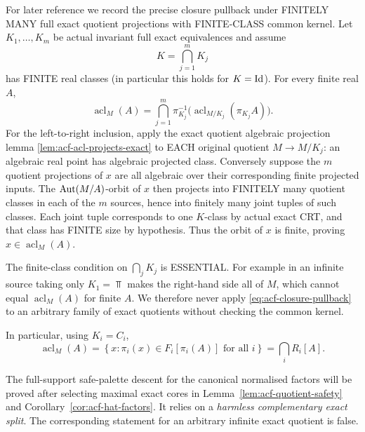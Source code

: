 For later reference we record the precise
closure pullback under FINITELY MANY
full exact quotient projections with
FINITE-CLASS common kernel. Let
\(K_1,\ldots,K_m\) be actual invariant
full exact equivalences and assume
\[
                     K=\bigcap_{j=1}^m K_j
\]
has FINITE real classes (in particular
this holds for \(K=\mathrm{Id}\)).
For every finite real \(A\),
\begin{equation}\label{eq:acf-closure-pullback}
 \operatorname{acl}_M(A)=
 \bigcap_{j=1}^m
 \pi_{K_j}^{-1}
       \bigl(\operatorname{acl}_{M/K_j}(\pi_{K_j}A)\bigr).
\end{equation}
For the left-to-right inclusion,
apply the exact quotient algebraic
projection lemma
\cref{lem:acf-acl-projects-exact}
to EACH original quotient
\(M\to M/K_j\): an algebraic
real point has algebraic projected
class. Conversely suppose the
\(m\) quotient projections of
\(x\) are all algebraic over
their corresponding finite
projected inputs. The
\(\operatorname{Aut}(M/A)\)-orbit of \(x\)
then projects into FINITELY
many quotient classes in each
of the \(m\) sources, hence
into finitely many joint
tuples of such classes.
Each joint tuple corresponds
to one \(K\)-class by actual
exact CRT, and that class has
FINITE size by hypothesis.
Thus the orbit of \(x\)
is finite, proving
\(x\in\operatorname{acl}_M(A)\).

The finite-class condition on
\(\bigcap_jK_j\) is ESSENTIAL.
For example in an infinite
source taking only
\(K_1=\Top\) makes the
right-hand side all of \(M\),
which cannot equal
\(\operatorname{acl}_M(A)\)
for finite \(A\).
We therefore never apply
\eqref{eq:acf-closure-pullback}
to an arbitrary family
of exact quotients without
checking the common kernel.

In particular, using \(K_i=C_i\),
\[
 \operatorname{acl}_M(A)=
   \left\{x:
     \pi_i(x)\in F_i[\pi_i(A)]
                    \text{ for all }i\right\}
 =\bigcap_iR_i[A].
 \tag{\(\spadesuit\)}\label{eq:acf-closure-bands}
\]

\begin{remark}
The full-support safe-palette descent for the canonical
normalised factors will be proved after selecting maximal
exact cores in Lemma~\ref{lem:acf-quotient-safety} and
Corollary~\ref{cor:acf-hat-factors}.  It relies on a
\emph{harmless complementary exact split}.  The corresponding
statement for an arbitrary infinite exact quotient is false.
\end{remark}
